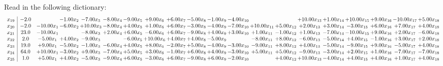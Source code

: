 \documentclass[9pt]{article}
\begin{document}
Read in the following dictionary:
\[\begin{array}{c| c c@{\hskip 2pt} c@{\hskip 2pt} c@{\hskip 2pt} c@{\hskip 2pt} c@{\hskip 2pt} c@{\hskip 2pt} c@{\hskip 2pt} c@{\hskip 2pt} c@{\hskip 2pt} c@{\hskip 2pt} c@{\hskip 2pt} c@{\hskip 2pt} c@{\hskip 2pt} c@{\hskip 2pt} c@{\hskip 2pt} c@{\hskip 2pt} c@{\hskip 2pt} c@{\hskip 2pt} }
 x_{19}   &  -2.0  &   & -1.00 x_{2} & -7.00 x_{3} & -8.00 x_{4} & -9.00 x_{5} & +  9.00 x_{6} & +  6.00 x_{7} & -5.00 x_{8} & -1.00 x_{9} & -4.00 x_{10} &    &   & + 10.00 x_{13} & +  1.00 x_{14} & + 10.00 x_{15} & +  9.00 x_{16} & -10.00 x_{17} & +  5.00 x_{18}\\
 x_{20}   &  -2.0 & -10.00 x_{1} & -6.00 x_{2} & + 10.00 x_{3} & -8.00 x_{4} & +  4.00 x_{5} & +  1.00 x_{6} & +  6.00 x_{7} & -3.00 x_{8} & -4.00 x_{9} & -7.00 x_{10} & + 10.00 x_{11} & +  5.00 x_{12} & +  2.00 x_{13} & +  3.00 x_{14} & -3.00 x_{15} & +  6.00 x_{16} & +  7.00 x_{17} & +  4.00 x_{18}\\
 x_{21}   &  23.0 & -10.00 x_{1} &   & -8.00 x_{3} & +  2.00 x_{4} & +  6.00 x_{5} & -6.00 x_{6} & +  6.00 x_{7} & -9.00 x_{8} & +  4.00 x_{9} & +  3.00 x_{10} & +  1.00 x_{11} & -1.00 x_{12} & +  1.00 x_{13} & -7.00 x_{14} & -10.00 x_{15} & +  9.00 x_{16} & +  2.00 x_{17} & -6.00 x_{18}\\
 x_{22}   &  2.0 & -5.00 x_{1} & +  4.00 x_{2} & -9.00 x_{3} &   & -6.00 x_{5} & + 10.00 x_{6} & +  4.00 x_{7} & +  4.00 x_{8} & -5.00 x_{9} &   & -8.00 x_{11} & +  8.00 x_{12} & -6.00 x_{13} & -5.00 x_{14} & +  4.00 x_{15} & -1.00 x_{16} & +  3.00 x_{17} & +  2.00 x_{18}\\
 x_{23}   &  19.0 & +  9.00 x_{1} & -5.00 x_{2} & -1.00 x_{3} & -6.00 x_{4} & +  4.00 x_{5} & +  8.00 x_{6} & -2.00 x_{7} & +  5.00 x_{8} & -4.00 x_{9} & -3.00 x_{10} & -9.00 x_{11} & +  8.00 x_{12} & +  4.00 x_{13} & -5.00 x_{14} & -9.00 x_{15} & +  9.00 x_{16} & -5.00 x_{17} & +  4.00 x_{18}\\
 x_{24}   &  64.0 & + 10.00 x_{1} & -3.00 x_{2} & +  9.00 x_{3} & -7.00 x_{4} & +  5.00 x_{5} & +  3.00 x_{6} & -1.00 x_{7} & +  6.00 x_{8} & +  4.00 x_{9} & -3.00 x_{10} & +  5.00 x_{11} & +  5.00 x_{12} & -9.00 x_{13} & -3.00 x_{14} & +  2.00 x_{15} & +  1.00 x_{16} & -7.00 x_{17} & -7.00 x_{18}\\
 x_{25}   &  1.0 & +  5.00 x_{1} & +  4.00 x_{2} & -5.00 x_{3} & -9.00 x_{4} & +  6.00 x_{5} & -3.00 x_{6} & +  6.00 x_{7} & -9.00 x_{8} & +  6.00 x_{9} & -2.00 x_{10} &   & +  4.00 x_{12} & + 10.00 x_{13} & -4.00 x_{14} & +  4.00 x_{15} & +  4.00 x_{16} & +  1.00 x_{17} & +  4.00 x_{18}\\

\end{array}\]
\end{document}
